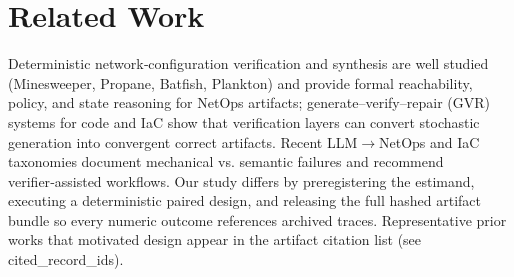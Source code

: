 \documentclass[conference]{IEEEtran}
\begin{document}
\section{Related Work}
Deterministic network‑configuration verification and synthesis are well studied (Minesweeper, Propane, Batfish, Plankton) and provide formal reachability, policy, and state reasoning for NetOps artifacts; generate--verify--repair (GVR) systems for code and IaC show that verification layers can convert stochastic generation into convergent correct artifacts. Recent LLM\ensuremath{\rightarrow}NetOps and IaC taxonomies document mechanical vs. semantic failures and recommend verifier‑assisted workflows. Our study differs by preregistering the estimand, executing a deterministic paired design, and releasing the full hashed artifact bundle so every numeric outcome references archived traces. Representative prior works that motivated design appear in the artifact citation list (see cited\_record\_ids).
\end{document}
